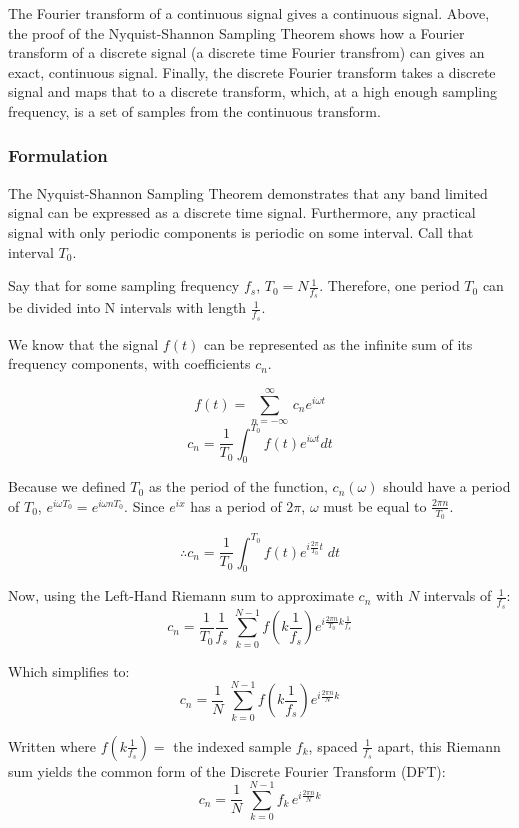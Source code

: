 \documentclass[12pt]{article}
\begin{document}
The Fourier transform of a continuous signal gives a continuous signal. Above,
the proof of the Nyquist-Shannon Sampling Theorem shows how a Fourier transform
of a discrete signal (a discrete time Fourier transfrom) can gives an exact, continuous signal. Finally, the
discrete Fourier transform takes a discrete signal and maps that to a discrete
transform, which, at a high enough sampling frequency, is a set of samples from
the continuous transform.

\subsubsection{Formulation}

The Nyquist-Shannon Sampling Theorem demonstrates that any band limited signal
can be expressed as a discrete time signal. Furthermore, any practical signal
with only periodic components is periodic on some interval. Call that interval
\( T_0\). 

Say that for some sampling frequency \(f_s\), \(T_0 = N\frac{1}{f_{s}} \).
Therefore, one period \( T_0\) can be divided into N intervals with length \(
\frac{1}{f_{s}}\).

We know that the signal \(f(t)\) can be represented as the infinite sum of its
frequency components, with coefficients \(c_n\).

\[ f(t) = \sum_{n = -\infty}^{\infty} \,c_n e^{i\omega t} \] \[ c_{n} =
\frac{1}{T_0} \int_{0}^{T_0} f(t) e^{i\omega t} dt\]

Because we defined \(T_0\) as the period of the function, \(c_{n}(\omega) \)
should have a period of \( T_0\), \(e^{i\omega T_0} = e^{i\omega nT_0}\). Since
\(e^{i x}\) has a period of \( 2\pi \), \( \omega \) must be equal to
\(\frac{2\pi n}{T_0} \). 

\[ \therefore c_{n} = \frac{1}{T_0} \int_{0}^{T_0} f(t) e^{i \frac{2\pi}{T_0} t
} \; dt\] 

Now, using the Left-Hand Riemann sum to approximate \( c_n\) with \( N\)
intervals of \( \frac{1}{f_s} \): \[ c_{n} = \frac{1}{T_0} \frac{1}{f_s} \;
\sum_{k = 0}^{N-1} f(k \frac{1}{f_s}) e^{i \frac{2\pi n}{T_0} k\frac{1}{f_s}}
\]

Which simplifies to: \[ c_{n} = \frac{1}{N} \; \sum_{k = 0}^{N-1} f(k
\frac{1}{f_s}) e^{i \frac{2\pi n}{N}k} \]

Written where \( f(k \frac{1}{f_s}) =\) the indexed sample \(f_k\), spaced
\(\frac{1}{f_s}\) apart, this Riemann sum yields the common form of the
Discrete Fourier Transform (DFT): \[ c_{n} = \frac{1}{N} \; \sum_{k = 0}^{N-1}
f_k \, e^{i \frac{2\pi n}{N}k} \]
\end{document}
